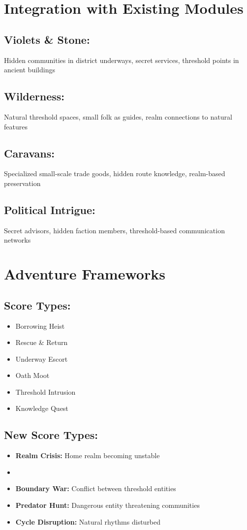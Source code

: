 \documentclass[11pt]{book}
\begin{document}
\section{Integration with Existing Modules}
\subsection*{Violets \& Stone:}
Hidden communities in district underways, secret services, threshold points in ancient buildings

\subsection*{Wilderness:}
Natural threshold spaces, small folk as guides, realm connections to natural features

\subsection*{Caravans:}
Specialized small-scale trade goods, hidden route knowledge, realm-based preservation

\subsection*{Political Intrigue:}
Secret advisors, hidden faction members, threshold-based communication networks

\section{Adventure Frameworks}
\subsection*{Score Types:}
\begin{itemize}[leftmargin=*]
\item Borrowing Heist
\item Rescue \& Return  
\item Underway Escort
\item Oath Moot
\item Threshold Intrusion
\item Knowledge Quest
\end{itemize}

\subsection*{New Score Types:}
\begin{itemize}[leftmargin=*]
\item \textbf{Realm Crisis:} Home realm becoming unstable
\item \item \textbf{Boundary War:} Conflict between threshold entities
    \item \textbf{Predator Hunt:} Dangerous entity threatening communities
    \item \textbf{Cycle Disruption:} Natural rhythms disturbed
\end{itemize}
\end{document}
